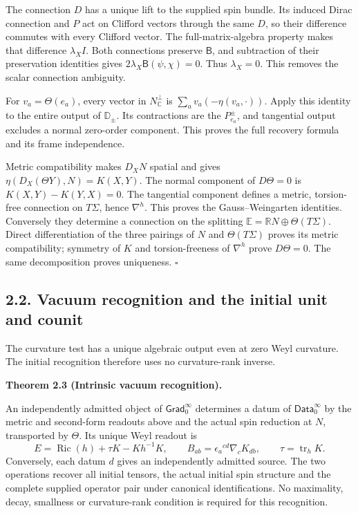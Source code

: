 \documentclass[
  english,
  11pt,
  reqno]{amsart}
\makeatletter
\newcommand{\pandocstatementheading}[1]{%
  \par\if@nobreak\else
    \addpenalty{\@beginparpenalty}%
    \addvspace{.5\baselineskip plus .2\baselineskip minus .2\baselineskip}%
  \fi
  {\normalfont\bfseries #1\par}%
  \nobreak\@afterindenttrue\@afterheading
}
\makeatother
\begin{document}
The connection \(D\) has a unique lift to the supplied spin bundle. Its
induced Dirac connection and \(P\) act on Clifford vectors through the
same \(D\), so their difference commutes with every Clifford vector. The
full-matrix-algebra property makes that difference \(\lambda_X I\). Both
connections preserve \(\mathsf B\), and subtraction of their
preservation identities gives \(2\lambda_X\mathsf B(\psi,\chi)=0\). Thus
\(\lambda_X=0\). This removes the scalar connection ambiguity.

For \(v_a=\Theta(e_a)\), every vector in \(N^\perp_{\mathbb C}\) is
\(\sum_a v_a(-\eta(v_a,\cdot))\). Apply this identity to the entire
output of \(\mathbb D_\pm\). Its contractions are the \(P_{e_a}^\pm\),
and tangential output excludes a normal zero-order component. This
proves the full recovery formula and its frame independence.

Metric compatibility makes \(D_XN\) spatial and gives
\(\eta(D_X(\Theta Y),N)=K(X,Y)\). The normal component of \(D\Theta=0\)
is \(K(X,Y)-K(Y,X)=0\). The tangential component defines a metric,
torsion-free connection on \(T\Sigma\), hence \(\nabla^h\). This proves
the Gauss--Weingarten identities. Conversely they determine a connection
on the splitting \(\mathbb E=\mathbb RN\oplus\Theta(T\Sigma)\). Direct
differentiation of the three pairings of \(N\) and \(\Theta(T\Sigma)\)
proves its metric compatibility; symmetry of \(K\) and torsion-freeness
of \(\nabla^h\) prove \(D\Theta=0\). The same decomposition proves
uniqueness. \hfill\(\square\)

\subsection{2.2. Vacuum recognition and the initial unit and
counit}\label{vacuum-recognition-and-the-initial-unit-and-counit}\label{sec:online-intrinsic-vacuum-recognition}

The curvature test has a unique algebraic output even at zero Weyl
curvature. The initial recognition therefore uses no curvature-rank
inverse.

\pandocstatementheading{\leavevmode{}\label{thm:online-intrinsic-gradient-vacuum-recognition}Theorem 2.3 (Intrinsic vacuum recognition).}

An independently admitted object of \(\mathsf{Grad}_0^\infty\)
determines a datum of \(\mathsf{Data}_0^\infty\) by the metric and
second-form readouts above and the actual spin reduction at \(N\),
transported by \(\Theta\). Its unique Weyl readout is%
 \[
E=\operatorname{Ric}(h)+\tau K-Kh^{-1}K,\qquad
B_{ab}=\epsilon_a{}^{cd}\nabla_cK_{db},
\qquad \tau=\operatorname{tr}_hK.
\] Conversely, each datum \(d\) gives an independently admitted source.
The two operations recover all initial tensors, the actual initial spin
structure and the complete supplied operator pair under canonical
identifications. No maximality, decay, smallness or curvature-rank
condition is required for this recognition.
\end{document}
